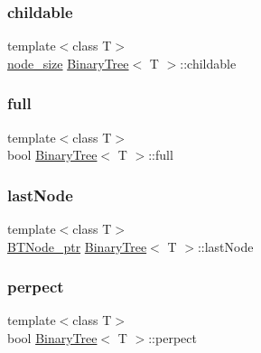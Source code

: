 \mbox{\label{class_binary_tree_a0497a11fec63475eb2d35f56bd990fc9}} 
\subsubsection{\texorpdfstring{childable}{childable}}
{\footnotesize\ttfamily template$<$class T$>$ \\
\hyperlink{class_binary_tree_a6c9d1d57bf13ca658fe926a0c7255ecf}{node\+\_\+size} \hyperlink{class_binary_tree}{Binary\+Tree}$<$ T $>$\+::childable\hspace{0.3cm}{\ttfamily [protected]}}

\mbox{\label{class_binary_tree_a331f90345d6b53021945eb74a35a9d69}} 
\subsubsection{\texorpdfstring{full}{full}}
{\footnotesize\ttfamily template$<$class T$>$ \\
bool \hyperlink{class_binary_tree}{Binary\+Tree}$<$ T $>$\+::full\hspace{0.3cm}{\ttfamily [protected]}}

\mbox{\label{class_binary_tree_a8de6e53383dad4cb80e07b361556efd5}} 
\subsubsection{\texorpdfstring{last\+Node}{lastNode}}
{\footnotesize\ttfamily template$<$class T$>$ \\
\hyperlink{class_binary_tree_a35ef67d8ee2843144c5c309c5a6ecd5b}{B\+T\+Node\+\_\+ptr} \hyperlink{class_binary_tree}{Binary\+Tree}$<$ T $>$\+::last\+Node\hspace{0.3cm}{\ttfamily [protected]}}

\mbox{\label{class_binary_tree_af98b75fa16f1b5789106784f8c385434}} 
\subsubsection{\texorpdfstring{perpect}{perpect}}
{\footnotesize\ttfamily template$<$class T$>$ \\
bool \hyperlink{class_binary_tree}{Binary\+Tree}$<$ T $>$\+::perpect\hspace{0.3cm}{\ttfamily [protected]}}

